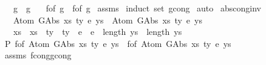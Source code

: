 \begin{isabellebody}
\ \ \ {\isachardoublequoteopen}g{}\ {\isasymsimeq}\ g{}{\isachardoublequoteclose}\isanewline
\ \ \ {\isachardoublequoteopen}f{\isacharunderscore}{\kern0pt}of\ g{}\ {\isacharequal}{\kern0pt}\ f{\isacharunderscore}{\kern0pt}of\ g{}{\isachardoublequoteclose}\isanewline
%
\isadelimproof
%
\endisadelimproof
%
\isatagproof
{}\isamarkupfalse%
\ assms\isanewline
{}\isamarkupfalse%
\ {\isacharparenleft}{\kern0pt}induct\ set{\isacharcolon}{\kern0pt}\ gcong{\isacharparenright}{\kern0pt}\isanewline
{}\isamarkupfalse%
\ auto%
\endisatagproof
{\isafoldproof}%
%
\isadelimproof
\isanewline
%
\endisadelimproof
\isanewline
\isanewline
{}\isamarkupfalse%
\ abs{\isacharunderscore}{\kern0pt}cong{\isacharunderscore}{\kern0pt}inv{\isacharcolon}{\kern0pt}\isanewline
\ \ \ {\isachardoublequoteopen}Atom\ {\isacharparenleft}{\kern0pt}GAbs\ xs{}\ ty{}\ e{}{\isacharparenright}{\kern0pt}\ ys{}\ {\isasymsimeq}\ Atom\ {\isacharparenleft}{\kern0pt}GAbs\ xs{}\ ty{}\ e{}{\isacharparenright}{\kern0pt}\ ys{}{\isachardoublequoteclose}\isanewline
\ \ \ {\isachardoublequoteopen}xs{}\ {\isacharequal}{\kern0pt}\ xs{}\ {\isasymand}\ ty{}\ {\isacharequal}{\kern0pt}\ ty{}\ {\isasymand}\ e{}\ {\isacharequal}{\kern0pt}\ e{}\ {\isasymand}\ length\ ys{}\ {\isacharequal}{\kern0pt}\ length\ ys{}{\isachardoublequoteclose}\isanewline
%
\isadelimproof
%
\endisadelimproof
%
\isatagproof
{}\isamarkupfalse%
\ {\isacharminus}{\kern0pt}\isanewline
\ \ \isamarkupfalse%
\ P{}{\isacharcolon}{\kern0pt}\ {\isachardoublequoteopen}f{\isacharunderscore}{\kern0pt}of\ {\isacharparenleft}{\kern0pt}Atom\ {\isacharparenleft}{\kern0pt}GAbs\ xs{}\ ty{}\ e{}{\isacharparenright}{\kern0pt}\ ys{}{\isacharparenright}{\kern0pt}\ {\isacharequal}{\kern0pt}\ f{\isacharunderscore}{\kern0pt}of\ {\isacharparenleft}{\kern0pt}Atom\ {\isacharparenleft}{\kern0pt}GAbs\ xs{}\ ty{}\ e{}{\isacharparenright}{\kern0pt}\ ys{}{\isacharparenright}{\kern0pt}{\isachardoublequoteclose}\isanewline
\ \ \ \ \isamarkupfalse%
\ assms\ f{\isacharunderscore}{\kern0pt}cong{\isacharunderscore}{\kern0pt}gcong\ \isamarkupfalse%

\end{isabellebody}
